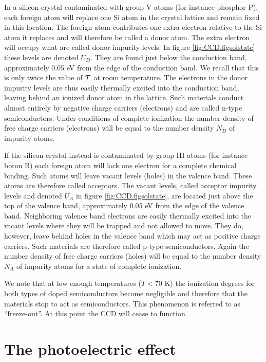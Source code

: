 In a silicon crystal contaminated with group V atoms (for instance
phosphor P), each foreign atom will replace one Si atom in the crystal
lattice and remain fixed in this location. The foreign atom
contributes one extra electron relative to the Si atom it replaces and
will therefore be called a donor atom. The extra electron will occupy
what are called donor impurity levels. In figure \ref{fig:CCD.figsolstate}
these levels are denoted $U_D$. They are found just below the
conduction band, approximately 0.05 eV from the edge of the conduction
band. We recall that this is only twice the value of ${\cal T}$ at room
temperature. The electrons in the donor impurity levels are thus
easily thermally excited into the conduction band, leaving behind an
ionized donor atom in the lattice. Such materials conduct almost
entirely by negative charge carriers (electrons) and are called n-type
semiconductors. Under conditions of complete ionization the number
density of free charge carriers (electrons) will be equal to the
number density $N_D$ of impurity atoms.

If the silicon crystal instead is contaminated by group III atoms (for
instance boron B) each foreign atom will lack one electron for a
complete chemical binding. Such atoms will leave vacant levels (holes)
in the valence band. These atoms are therefore called acceptors.  The
vacant levels, called acceptor impurity levels and denoted $U_A$ in
figure \ref{fig:CCD.figsolstate}, are located just above the top of the
valence band, approximately 0.05 eV from the edge of the valence band.
Neighboring valence band electrons are easily thermally excited into
the vacant levels where they will be trapped and not allowed to
move. They do, however, leave behind holes in the valence band which
may act as positive charge carriers. Such materials are therefore
called p-type semiconductors. Again the number density of free charge
carriers (holes) will be equal to the number density $N_A$ of impurity
atoms for a state of complete ionization.

We note that at low enough temperatures ($T < 70$ K) the ionization
degrees for both types of doped semiconductors become negligible and
therefore that the materials stop to act as semiconductors. This
phenomenon is referred to as ``freeze-out''. At this point the CCD
will cease to function.

\section{The photoelectric effect}

